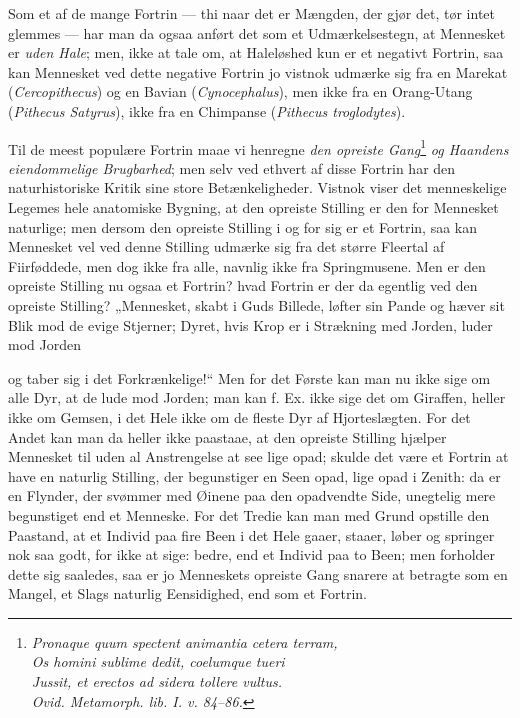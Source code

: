 \documentclass[12pt,a4paper]{book}
\begin{document}
Som et af de mange Fortrin --- thi naar det er Mængden, der gjør det, tør intet
glemmes --- har man da ogsaa anført det som et Udmærkelsestegn, at Mennesket er
\emph{uden Hale}; men, ikke at tale om, at Haleløshed kun er et negativt Fortrin,
saa kan Mennesket ved dette negative Fortrin jo vistnok udmærke sig fra en
Marekat (\textit{Cercopithecus}) og en Bavian (\textit{Cynocephalus}), men ikke
fra en Orang-Utang (\textit{Pithecus Satyrus}), ikke fra en Chimpanse
(\textit{Pithecus troglodytes}).

Til de meest populære Fortrin maae vi henregne \emph{den opreiste
Gang}\footnote{\textit{Pronaque quum spectent animantia cetera terram,\\
Os homini sublime dedit, coelumque tueri\\
Jussit, et erectos ad sidera tollere vultus.\\
Ovid. Metamorph. lib. I. v. 84--86.}}
\emph{og Haandens eiendommelige Brugbarhed}; men selv ved ethvert af disse
Fortrin har den naturhistoriske Kritik sine store Betænkeligheder. Vistnok viser
det menneskelige Legemes hele anatomiske Bygning, at den opreiste Stilling er
den for Mennesket naturlige; men dersom den opreiste Stilling i og for sig er et
Fortrin, saa kan Mennesket vel ved denne Stilling udmærke sig fra det større
Fleertal af Fiirføddede, men dog ikke fra alle, navnlig ikke fra Springmusene.
Men er den opreiste Stilling nu ogsaa et Fortrin? hvad Fortrin er der da
egentlig ved den opreiste Stilling? „Mennesket, skabt i Guds Billede, løfter sin
Pande og hæver sit Blik mod de evige Stjerner; Dyret, hvis Krop er i Strækning
med Jorden, luder mod Jorden

\setcounter{footnote}{0}
og taber sig i det Forkrænkelige!“ Men for det Første kan man nu ikke sige om
alle Dyr, at de lude mod Jorden; man kan f. Ex. ikke sige det om Giraffen,
heller ikke om Gemsen, i det Hele ikke om de fleste Dyr af Hjorteslægten. For
det Andet kan man da heller ikke paastaae, at den opreiste Stilling hjælper
Mennesket til uden al Anstrengelse at see lige opad; skulde det være et Fortrin
at have en naturlig Stilling, der begunstiger en Seen opad, lige opad i Zenith:
da er en Flynder, der svømmer med Øinene paa den opadvendte Side, unegtelig mere
begunstiget end et Menneske. For det Tredie kan man med Grund opstille den
Paastand, at et Individ paa fire Been i det Hele gaaer, staaer, løber og springer
nok saa godt, for ikke at sige: bedre, end et Individ paa to Been; men forholder
dette sig saaledes, saa er jo Menneskets opreiste Gang snarere at betragte som
en Mangel, et Slags naturlig Eensidighed, end som et Fortrin.
\end{document}
